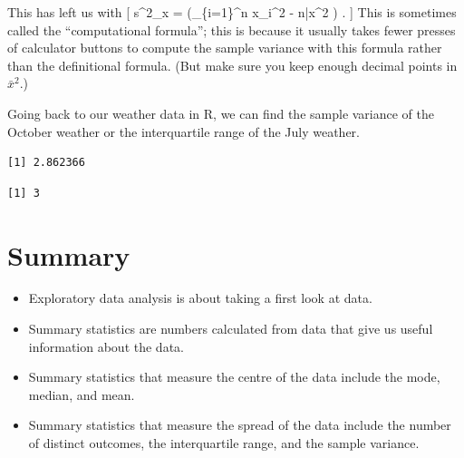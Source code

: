\documentclass[
  letterpaper,
  DIV=11,
  numbers=noendperiod]{scrreprt}
\newenvironment{Shaded}{\begin{snugshade}}{\end{snugshade}}
\newcommand{\FunctionTok}[1]{\textcolor[rgb]{0.28,0.35,0.67}{#1}}
\newcommand{\NormalTok}[1]{\textcolor[rgb]{0.00,0.23,0.31}{#1}}
\newcommand{\SpecialCharTok}[1]{\textcolor[rgb]{0.37,0.37,0.37}{#1}}
\providecommand{\tightlist}{%
  \setlength{\itemsep}{0pt}\setlength{\parskip}{0pt}}\usepackage{longtable,booktabs,array}
\theoremstyle{remark}
\begin{document}
This has left us with {[} s\^{}2\_x = 
\left(\sum\_\{i=1\}\^{}n x\_i\^{}2 - n\bar x\^{}2 \right) . {]} This is
sometimes called the ``computational formula''; this is because it
usually takes fewer presses of calculator buttons to compute the sample
variance with this formula rather than the definitional formula. (But
make sure you keep enough decimal points in \(\bar x^2\).)

Going back to our weather data in R, we can find the sample variance of
the October weather or the interquartile range of the July weather.

\begin{Shaded}
\end{Shaded}

\begin{verbatim}
[1] 2.862366
\end{verbatim}

\begin{Shaded}
\end{Shaded}

\begin{verbatim}
[1] 3
\end{verbatim}

\hypertarget{summary-01}{%
\section*{Summary}\label{summary-01}}


\begin{itemize}
\tightlist
\item
  Exploratory data analysis is about taking a first look at data.
\item
  Summary statistics are numbers calculated from data that give us
  useful information about the data.
\item
  Summary statistics that measure the centre of the data include the
  mode, median, and mean.
\item
  Summary statistics that measure the spread of the data include the
  number of distinct outcomes, the interquartile range, and the sample
  variance.
\end{itemize}
\end{document}
